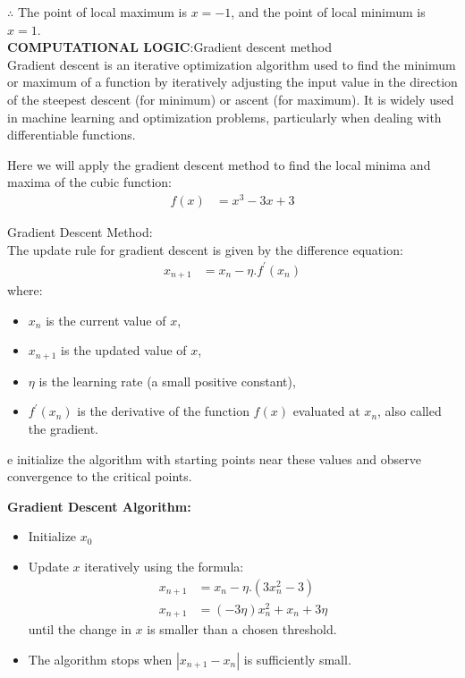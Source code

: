 \documentclass[journal]{IEEEtran}
\begin{document}
$\therefore$ The point of local maximum is $x = -1$, and the point of local minimum is $x = 1$.\\

\textbf{COMPUTATIONAL LOGIC}:Gradient descent method\\

Gradient descent is an iterative optimization algorithm used to find the minimum or maximum of a function by iteratively adjusting the input value in the direction of the steepest descent (for minimum) or ascent (for maximum). It is widely used in machine learning and optimization problems, particularly when dealing with differentiable functions.

Here we will apply the gradient descent method to find the local minima and maxima of the cubic function:
\begin{align}
f(x) &= x^3 - 3x + 3
\end{align}

Gradient Descent Method:\\

The update rule for gradient descent is given by the difference equation:
\begin{align}
x_{n+1} &= x_n - \eta.f^{\prime}(x_n)
\end{align}
where:
\begin{itemize}
    \item $ x_n $ is the current value of $ x $,
    \item $ x_{n+1} $ is the updated value of $ x $,
    \item $ \eta $ is the learning rate (a small positive constant),
    \item $ f^{\prime}(x_n) $ is the derivative of the function $ f(x) $ evaluated at $ x_n $, also called the gradient.
\end{itemize}

e initialize the algorithm with starting points near these values and observe convergence to the critical points.

\textbf{Gradient Descent Algorithm:}
\begin{itemize}
    \item Initialize \( x_0 \) 
    \item Update \( x \) iteratively using the formula:
    \begin{align}
    x_{n+1} &= x_n - \eta.(3x_n^2 - 3)\\
    x_{n+1} &=(-3\eta)x_n^2 + x_n + 3\eta
    \end{align}
    until the change in \( x \) is smaller than a chosen threshold.
    \item The algorithm stops when \( |x_{n+1} - x_n| \) is sufficiently small.
\end{itemize}
\end{document}
